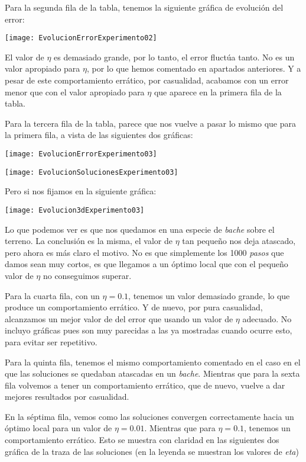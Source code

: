 \documentclass[11pt]{article}
\begin{document}
Para la segunda fila de la tabla, tenemos la siguiente gráfica de evolución del error:

\texttt{[image: EvolucionErrorExperimento02]}

El valor de $\eta$ es demasiado grande, por lo tanto, el error fluctúa tanto. No es un valor apropiado para $\eta$, por lo que hemos comentado en apartados anteriores. Y a pesar de este comportamiento errático, por casualidad, acabamos con un error menor que con el valor apropiado para $\eta$ que aparece en la primera fila de la tabla.

Para la tercera fila de la tabla, parece que nos vuelve a pasar lo mismo que para la primera fila, a vista de las siguientes dos gráficas:

\texttt{[image: EvolucionErrorExperimento03]}

\texttt{[image: EvolucionSolucionesExperimento03]}

Pero si nos fijamos en la siguiente gráfica:

\texttt{[image: Evolucion3dExperimento03]}

Lo que podemos ver es que nos quedamos en una especie de \emph{bache} sobre el terreno. La conclusión es la misma, el valor de $\eta$ tan pequeño nos deja atascado, pero ahora es más claro el motivo. No es que simplemente los 1000 \emph{pasos} que damos sean muy cortos, es que llegamos a un óptimo local que con el pequeño valor de $\eta$ no conseguimos superar.

Para la cuarta fila, con un $\eta = 0.1$, tenemos un valor demasiado grande, lo que produce un comportamiento errático. Y de nuevo, por pura casualidad, alcanzamos un mejor valor de del error que usando un valor de $\eta$ adecuado. No incluyo gráficas pues son muy parecidas a las ya mostradas cuando ocurre esto, para evitar ser repetitivo.

Para la quinta fila, tenemos el mismo comportamiento comentado en el caso en el que las soluciones se quedaban atascadas en un \emph{bache}. Mientras que para la sexta fila volvemos a tener un comportamiento errático, que de nuevo, vuelve a dar mejores resultados por casualidad.

En la séptima fila, vemos como las soluciones convergen correctamente hacia un óptimo local para un valor de $\eta = 0.01$. Mientras que para $\eta = 0.1$, tenemos un comportamiento errático. Esto se muestra con claridad en las siguientes dos gráfica de la traza de las soluciones (en la leyenda se muestran los valores de \emph{eta})
\end{document}
